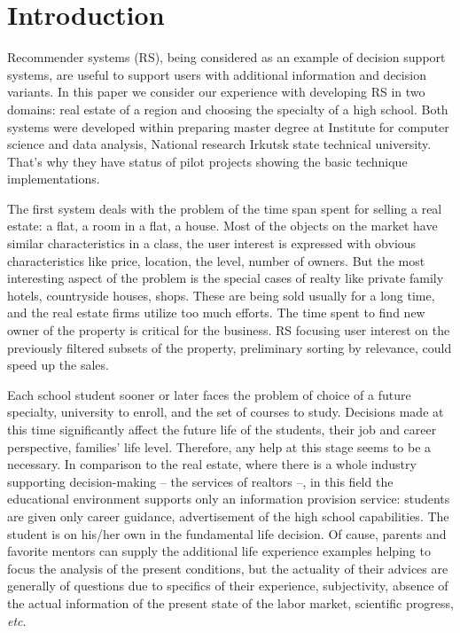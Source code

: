 \documentclass[conference]{IEEEtran}
\begin{document}
\section{Introduction}

Recommender systems (RS), being considered as an example of decision support systems, are useful to support users with additional information and decision variants.  In this paper we consider our experience with developing RS in two domains: real estate of a region and choosing the specialty of a high school.  Both systems were developed within preparing master degree at Institute for computer science and data analysis, National research Irkutsk state technical university.  That's why they have status of pilot projects showing the basic technique implementations.

The first system deals with the problem of the time span spent for selling a real estate: a flat, a room in a flat, a house.  Most of the objects on the market have similar characteristics in a class, the user interest is expressed with obvious characteristics like price, location, the level, number of owners.  But the most interesting aspect of the problem is the special cases of realty like private family hotels, countryside houses, shops.  These are being sold usually for a long time, and the real estate firms utilize too much efforts.  The time spent to find new owner of the property is critical for the business.  RS focusing user interest on the previously filtered subsets of the property, preliminary sorting by relevance, could speed up the sales.

Each school student sooner or later faces the problem of choice of a future specialty, university to enroll, and the set of courses to study.  Decisions made at this time significantly affect the future life of the students, their job and career perspective, families' life level.  Therefore, any help at this stage seems to be a necessary. In comparison to the real estate, where there is a whole industry supporting decision-making -- the services of realtors --, in this field the educational environment supports only an information provision service: students are given only career guidance, advertisement of the high school capabilities.  The student is on his/her own in the fundamental life decision.  Of cause, parents and favorite mentors can supply the additional life experience examples helping to focus the analysis of the present conditions, but the actuality of their advices are generally of questions due to specifics of their experience, subjectivity, absence of the actual information of the present state of the labor market, scientific progress, \emph{etc}.
\end{document}
